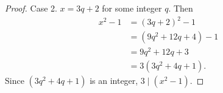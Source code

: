 \documentclass[12pt]{article}
\begin{document}
\begin{description}
\begin{spacing}{2}
\begin{proof}
\newline
Case 2. $x=3q+2$ for some integer $q$. Then
\begin{align*}
x^2-1 &= (3q+2)^2-1 \\
&= (9q^2+12q+4)-1 \\
&= 9q^2+12q+3 \\
&= 3(3q^2+4q+1).
\end{align*}
Since $(3q^2+4q+1)$ is an integer, $3 \mid (x^2-1)$.
\end{proof}
\end{spacing} 
\end{description}

%
\newpage
{}
%
\end{document}
